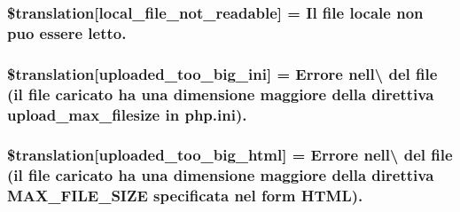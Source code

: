 \subsubsection[{\$translation}]{\setlength{\rightskip}{0pt plus 5cm}\$translation\mbox{[}\textquotesingle{}local\+\_\+file\+\_\+not\+\_\+readable\textquotesingle{}\mbox{]} = \textquotesingle{}Il file locale non puo essere letto.\textquotesingle{}}\label{class_8upload_8it___i_t_8php_a60104befef9b241f3a7a6a755618a4b3}
\hypertarget{class_8upload_8it___i_t_8php_a6a08dcd0d3651fdd098568f6b2f0a42c}{}
\subsubsection[{\$translation}]{\setlength{\rightskip}{0pt plus 5cm}\$translation\mbox{[}\textquotesingle{}uploaded\+\_\+too\+\_\+big\+\_\+ini\textquotesingle{}\mbox{]} = \textquotesingle{}Errore nell\textbackslash{} del file (il file caricato ha una dimensione maggiore della direttiva upload\+\_\+max\+\_\+filesize in php.\+ini).\textquotesingle{}}\label{class_8upload_8it___i_t_8php_a6a08dcd0d3651fdd098568f6b2f0a42c}
\hypertarget{class_8upload_8it___i_t_8php_a623d5b8b92169f57d7e43458aa911cbb}{}
\subsubsection[{\$translation}]{\setlength{\rightskip}{0pt plus 5cm}\$translation\mbox{[}\textquotesingle{}uploaded\+\_\+too\+\_\+big\+\_\+html\textquotesingle{}\mbox{]} = \textquotesingle{}Errore nell\textbackslash{} del file (il file caricato ha una dimensione maggiore della direttiva M\+A\+X\+\_\+\+F\+I\+L\+E\+\_\+\+S\+I\+Z\+E specificata nel form H\+T\+M\+L).\textquotesingle{}}\label{class_8upload_8it___i_t_8php_a623d5b8b92169f57d7e43458aa911cbb}
\hypertarget{class_8upload_8it___i_t_8php_a967c17da21b0a2d3bd65cca3a9ca0ea8}{}
